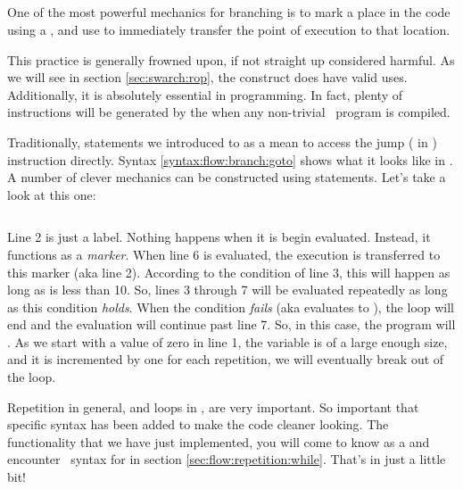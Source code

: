 \subsection{}

One of the most powerful mechanics for branching is to mark a place in the code using a , and use  to immediately transfer the point of execution to that location.

This practice is generally frowned upon, if not straight up considered harmful\cite{10.1145/362929.362947}. As we will see in section \ref{sec:swarch:rop}, the construct does have valid uses. Additionally, it is absolutely essential in  programming. In fact, plenty of  instructions will be generated by the  when any non-trivial \csharp\ program is compiled.

Traditionally,  statements we introduced to  as a mean to access the jump ( in ) instruction directly. Syntax \ref{syntax:flow:branch:goto} shows what it looks like in \csharp. A number of clever mechanics can be constructed using  statements. Let's take a look at this one:

\begin{syntaxfloat}
  
  \caption{Statements for using .}
  \label{syntax:flow:branch:goto}
\end{syntaxfloat}

\inputminted[linenos]{csharp}{../src/csharp/flow_branch/goto/Program.cs}

Line 2 is just a label. Nothing happens when it is begin evaluated. Instead, it functions as a \textsl{marker}. When line 6 is evaluated, the execution is transferred to this marker (aka line 2). According to the condition of line 3, this will happen as long as  is less than 10. So, lines 3 through 7 will be evaluated repeatedly as long as this condition \textsl{holds}. When the condition \textsl{fails} (aka evaluates to ), the loop will end and the evaluation will continue past line 7. So, in this case, the program will . As we start with a value of zero in line 1, the variable is of a large enough size, and it is incremented by one for each repetition, we will eventually break out of the loop.

Repetition in general, and loops in \csharp, are very important. So important that specific syntax has been added to make the code cleaner looking. The functionality that we have just implemented, you will come to know as a  and encounter \csharp\ syntax for in section \ref{sec:flow:repetition:while}. That's in just a little bit!

